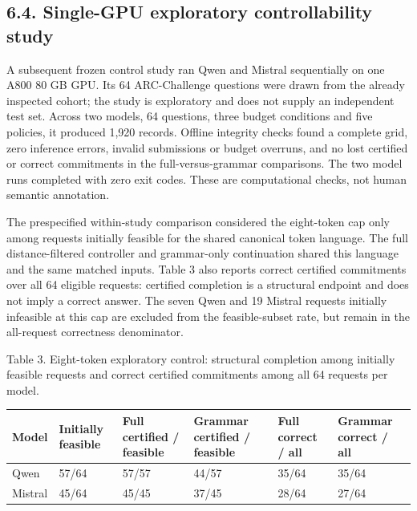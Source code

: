 \documentclass[
  12pt,
  a4paper,
]{article}
\begin{document}
\subsection{6.4. Single-GPU exploratory controllability study}

A subsequent frozen control study ran Qwen and Mistral sequentially on one A800 80 GB GPU. Its 64 ARC-Challenge questions were drawn from the already inspected cohort; the study is exploratory and does not supply an independent test set. Across two models, 64 questions, three budget conditions and five policies, it produced 1,920 records. Offline integrity checks found a complete grid, zero inference errors, invalid submissions or budget overruns, and no lost certified or correct commitments in the full-versus-grammar comparisons. The two model runs completed with zero exit codes. These are computational checks, not human semantic annotation.

The prespecified within-study comparison considered the eight-token cap only among requests initially feasible for the shared canonical token language. The full distance-filtered controller and grammar-only continuation shared this language and the same matched inputs. Table 3 also reports correct certified commitments over all 64 eligible requests: certified completion is a structural endpoint and does not imply a correct answer. The seven Qwen and 19 Mistral requests initially infeasible at this cap are excluded from the feasible-subset rate, but remain in the all-request correctness denominator.

Table 3. Eight-token exploratory control: structural completion among initially feasible requests and correct certified commitments among all 64 requests per model.

\begin{longtable}{@{}p{.10\linewidth}p{.13\linewidth}p{.16\linewidth}p{.16\linewidth}p{.16\linewidth}p{.16\linewidth}@{}}
\toprule
Model & Initially feasible & Full certified / feasible & Grammar certified / feasible & Full correct / all & Grammar correct / all \\
\midrule
\endhead
Qwen & 57/64 & 57/57 & 44/57 & 35/64 & 35/64 \\
Mistral & 45/64 & 45/45 & 37/45 & 28/64 & 27/64 \\
\bottomrule
\end{longtable}
\end{document}
